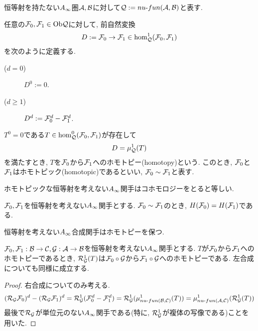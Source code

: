 \documentclass[uplatex, a4paper, 14Q, dvipdfmx]{jsarticle}
\begin{document}
恒等射を持たない$\Ainf$圏$\A, \B$に対して$\Q := \nufun{\A}{\B}$と表す. 

\begin{definition}[ホモトピー]
  任意の$\F_0,\F_1 \in \Ob\Q$に対して, 前自然変換
  \begin{align*}
    D := \F_0 \to \F_1 \in \hom^1_\Q(\F_0,\F_1)
  \end{align*}
  を次のように定義する. 
  \begin{description}
    \item[($d=0$)] $D^0 := 0$.
    \item[($d \geq 1$)] $D^d := \F_0^d - \F_1^d$.  
  \end{description}
  $T^0 = 0$である$T \in \hom^0_\Q(\F_0,\F_1)$が存在して
  \begin{align*}
    D = \mu^1_\Q(T)
  \end{align*}
  を満たすとき, $T$を$\F_0$から$\F_1$へのホモトピー(homotopy)という. 
  このとき, $\F_0$と$\F_1$はホモトピック(homotopic)であるといい, $\F_0 \sim \F_1$と表す.  
\end{definition}

ホモトピックな恒等射を考えない$\Ainf$関手はコホモロジーをとると等しい. 

\begin{lemma} \label{prop_cohomology_preserves_homotopic}
  $\F_0,\F_1$を恒等射を考えない$\Ainf$関手とする.
  $\F_0 \sim \F_1$のとき, $H(\F_0) = H(\F_1)$である.  
\end{lemma}

恒等射を考えない$\Ainf$合成関手はホモトピーを保つ. 

\begin{lemma} \label{prop_composition_functor_preserves_homotopic}
  $\F_0,\F_1 : \B \to \C, \G : \A \to \B$を恒等射を考えない$\Ainf$関手とする. 
  $T$が$\F_0$から$\F_1$へのホモトピーであるとき, $\RG^1(T)$は$\F_0 \circ \G$から$\F_1 \circ \G$へのホモトピーである. 
  左合成についても同様に成立する. 
\end{lemma}

\begin{proof}
  右合成についてのみ考える. 
  \begin{align*}
    (\RG \F_0)^d - (\RG \F_1)^d
    = \RG^1 (\F_0^d - \F_1^d) 
    = \RG^1(\mu^1_{\nufun{\B}{\C}} (T)) 
    = \mu^1_{\nufun{\A}{\C}} (\RG^1(T))
  \end{align*}
  最後で$\RG$が単位元のない$\Ainf$関手である(特に, $\RG^1$が複体の写像である)ことを用いた. 
\end{proof}
\end{document}
